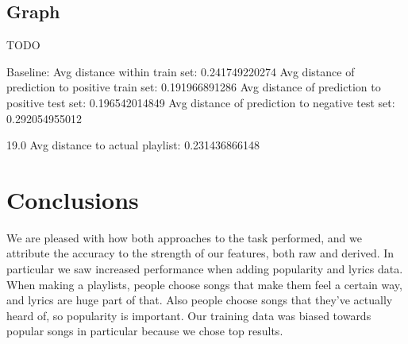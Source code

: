 \documentclass[acmtog]{acmart}
\begin{document}
\subsection{Graph}

TODO

Baseline: Avg distance within train set:          0.241749220274
Avg distance of prediction to positive train set: 0.191966891286
Avg distance of prediction to positive test set:  0.196542014849
Avg distance of prediction to negative test set:  0.292054955012

19.0
Avg distance to actual playlist: 0.231436866148

\section{Conclusions}

We are pleased with how both approaches to the task performed, and we attribute the accuracy to the strength of our features, both raw and derived. In particular we saw increased performance when adding popularity and lyrics data. When making a playlists, people choose songs that make them feel a certain way, and lyrics are huge part of that. Also people choose songs that they’ve actually heard of, so popularity is important. Our training data was biased towards popular songs in particular because we chose top results.


{}

%
\end{document}
